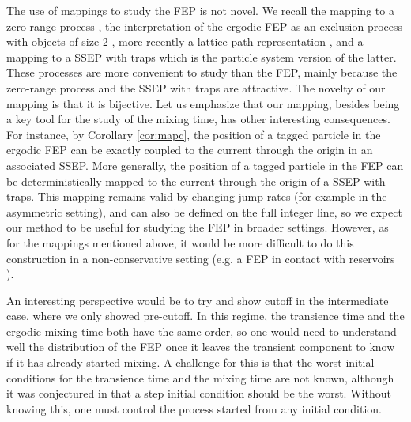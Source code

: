 \documentclass[11pt,a4paper]{article}
\begin{document}
The use of mappings to study the FEP is not novel. We recall the mapping to a zero-range process \cite{basu_activeabsorbing-state_2009, blondel_hydrodynamic_2020}, the interpretation of the ergodic FEP as an exclusion process with objects of size 2 \cite{gabel_facilitated_2010, ayre_mixing_2024}, more recently a lattice path representation \cite{ayre_mixing_2024}, and a mapping to a SSEP with traps \cite{erignoux_cutoff_2024} which is the particle system version of the latter. These processes are more convenient to study than the FEP, mainly because the zero-range process and the SSEP with traps are attractive. The novelty of our mapping is that it is bijective. Let us emphasize that our mapping, besides being a key tool for the study of the mixing time, has other interesting consequences. For instance, by Corollary \ref{cor:mapc}, the position of a tagged particle in the ergodic FEP can be exactly coupled to the current through the origin in an associated SSEP. More generally, the position of a tagged particle in the FEP can be deterministically mapped to the current through the origin of a SSEP with traps. This mapping remains valid by changing jump rates (for example in the asymmetric setting), and can also be defined on the full integer line, so we expect our method to be useful for studying the FEP in broader settings. However, as for the mappings mentioned above, it would be more difficult to do this construction in a non-conservative setting (e.g. a FEP in contact with reservoirs \cite{da_cunha_hydrodynamic_2024}). 

An interesting perspective would be to try and show cutoff in the intermediate case, where we only showed pre-cutoff. In this regime, the transience time and the ergodic mixing time both have the same order, so one would need to understand well the distribution of the FEP once it leaves the transient component to know if it has already started mixing. A challenge for this is that the worst initial conditions for the transience time and the mixing time are not known, although it was conjectured in \cite[Remark 1]{erignoux_cutoff_2024} that a step initial condition should be the worst. Without knowing this, one must control the process started from any initial condition. 
\end{document}
